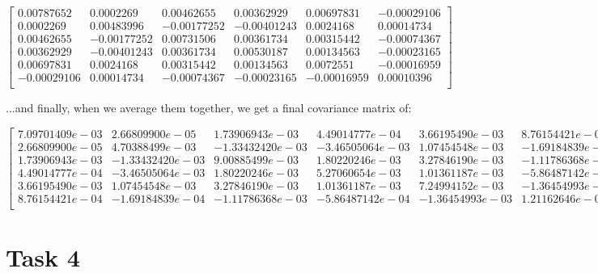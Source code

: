 \documentclass{article}
\begin{document}
\begin{equation}
    \begin{bmatrix}
        0.00787652  & 0.0002269   & 0.00462655  & 0.00362929  & 0.00697831  & -0.00029106 \\
        0.0002269   & 0.00483996  & -0.00177252 & -0.00401243 & 0.0024168   & 0.00014734  \\
        0.00462655  & -0.00177252 & 0.00731506  & 0.00361734  & 0.00315442  & -0.00074367 \\
        0.00362929  & -0.00401243 & 0.00361734  & 0.00530187  & 0.00134563  & -0.00023165 \\
        0.00697831  & 0.0024168   & 0.00315442  & 0.00134563  & 0.0072551   & -0.00016959 \\
        -0.00029106 & 0.00014734  & -0.00074367 & -0.00023165 & -0.00016959 & 0.00010396  \\
    \end{bmatrix}
\end{equation}

...and finally, when we average them together, we get a final covariance matrix of:

\begin{equation}
    \begin{bmatrix}
        7.09701409e-03 & 2.66809900e-05  & 1.73906943e-03  & 4.49014777e-04  & 3.66195490e-03  & 8.76154421e-04  \\
        2.66809900e-05 & 4.70388499e-03  & -1.33432420e-03 & -3.46505064e-03 & 1.07454548e-03  & -1.69184839e-04 \\
        1.73906943e-03 & -1.33432420e-03 & 9.00885499e-03  & 1.80220246e-03  & 3.27846190e-03  & -1.11786368e-03 \\
        4.49014777e-04 & -3.46505064e-03 & 1.80220246e-03  & 5.27060654e-03  & 1.01361187e-03  & -5.86487142e-04 \\
        3.66195490e-03 & 1.07454548e-03  & 3.27846190e-03  & 1.01361187e-03  & 7.24994152e-03  & -1.36454993e-03 \\
        8.76154421e-04 & -1.69184839e-04 & -1.11786368e-03 & -5.86487142e-04 & -1.36454993e-03 & 1.21162646e-03  \\
    \end{bmatrix}
\end{equation}

\section*{Task 4}
\end{document}
